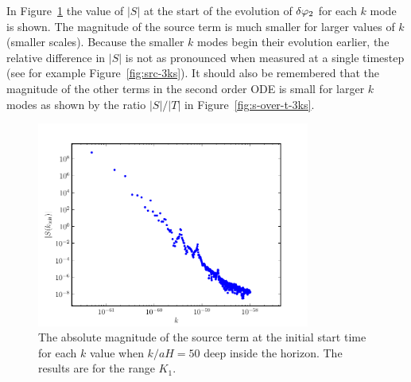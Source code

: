 In Figure~\ref{fig:src-kinit} the value of $|S|$ at the start of the evolution
of $\delta\varphi_{2}$ for each $k$ mode is shown. The magnitude of the source term is much
smaller for larger values of $k$ (smaller scales). 
Because the smaller $k$ modes begin their evolution earlier, the relative difference
in $|S|$ is not as pronounced when measured at a single timestep (see for example
Figure~\ref{fig:src-3ks}).
It should also be remembered that the magnitude of the other terms in the second
order ODE is small for larger $k$ modes as shown by the ratio $|S|/|T|$ in
Figure~\ref{fig:s-over-t-3ks}.
% 
\begin{figure}[htbp]
\centering
\includegraphics[width=0.8\textwidth]{numerical/graphs/src_kinit_log}
 \caption[Source term at initial start times]{The absolute magnitude of the source 
term at the initial start time for each $k$ value when $k/aH = 50$ deep inside
the
horizon. The results are for the range $K_1$.}
\label{fig:src-kinit}
\end{figure}
% 

